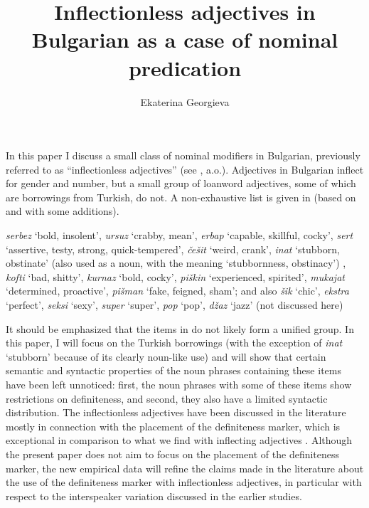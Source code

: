 \documentclass[output=paper]{langscibook}
\author{Ekaterina Georgieva\affiliation{HUN-REN Hungarian Research Centre for Linguistics}}
\title{Inflectionless adjectives in Bulgarian as a case of nominal predication}
\begin{document}
\maketitle

\noindent In this paper I discuss a small class of nominal modifiers in Bulgarian, previously referred to as “inflectionless adjectives” (see \citealt{Halpern1995,SpencerLuis2012,Nicolova2017,Adamson2019PhD,Adamson2020,Adamson2022}, a.o.). Adjectives in Bulgarian inflect for gender and number, but a small group of loanword adjectives, some of which are borrowings from Turkish, do not. A non-exhaustive list is given in  (based on \citealt[178]{Nicolova2017} and  \citealt{Adamson2019PhD} with some additions). 

\ea  \label{ge-ex-list-adj}
\emph{serbez} `bold, insolent', \emph{ursuz} `crabby, mean', \emph{erbap} `capable, skillful, cocky', \emph{sert} `assertive, testy, strong, quick-tempered', \emph{\v{c}e\v{s}it} `weird, crank', \emph{inat} `stubborn, obstinate' (also used as a noun, with the meaning `stubbornness, obstinacy')%
, \emph{kofti} `bad, shitty', \emph{kurnaz} `bold, cocky', \emph{pi\v{s}kin} `experienced, spirited', \emph{mukajat} `determined, proactive', \emph{pi\v{s}man} `fake, feigned, sham'; and also \emph{\v{s}ik} `chic', \emph{ekstra} `perfect', \emph{seksi} `sexy', \emph{super} `super', \emph{pop} `pop', \emph{d\v{z}az} `jazz' (not discussed here)
\z

\noindent It should be emphasized that the items in  do not likely form a unified group. In this paper, I will focus on the Turkish borrowings (with the exception of \emph{inat} `stubborn' because of its clearly noun-like use) and will show that certain semantic and syntactic properties of the noun phrases containing these items have been left unnoticed: first, the noun phrases with some of these items show restrictions on definiteness, and second, they also have a limited syntactic distribution. The inflectionless adjectives have been discussed in the literature mostly in connection with the placement of the definiteness marker, which is exceptional in comparison to what we find with inflecting adjectives \citep[see][]{Halpern1995,SpencerLuis2012,Adamson2019PhD,Adamson2020}. Although the present paper does not aim to focus on the placement of the definiteness marker, the new empirical data will refine the claims made in the literature about the use of the definiteness marker with inflectionless adjectives, in particular with respect to the interspeaker variation discussed in the earlier studies.
\end{document}
